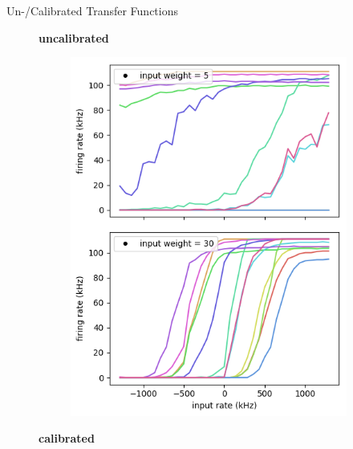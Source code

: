 \documentclass[12pt, aspectratio=169]{beamer}
\begin{document}
\begin{frame}{Un-/Calibrated Transfer Functions}
    \begin{figure}[!htb]
            \centering
            \textbf{uncalibrated}
            \begin{figure}
                \includegraphics[scale=0.44]{mfp/uncalibrated_activation_function_input.png}
                \label{membrane_potential}
            \end{figure}
      	\endminipage\hfill
            \centering
            \textbf{calibrated}
            \begin{figure}

\end{figure}
\end{figure}
\end{frame}
\end{document}
